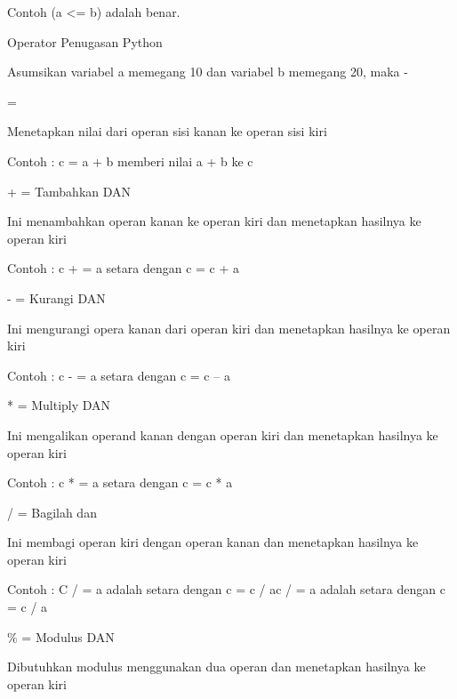 Contoh (a <= b) adalah benar. \par
\vspace{12pt}
\noindent 
Operator Penugasan Python \par
\vspace{12pt}
\noindent 
Asumsikan variabel a memegang 10 dan variabel b memegang 20, maka - \par
\vspace{12pt}
\noindent 
= \par
\noindent 
Menetapkan nilai dari operan sisi kanan ke operan sisi kiri \hspace*{4.41in}  \par
\noindent 
Contoh : c = a + b memberi nilai a + b ke c \par
\noindent 
\vspace{12pt}
\noindent 
+ = Tambahkan DAN \par
\noindent 
Ini menambahkan operan kanan ke operan kiri dan menetapkan hasilnya ke operan kiri \par
\noindent 
Contoh : c + = a setara dengan c = c + a \par
\noindent 
\vspace{12pt}
\noindent 
- = Kurangi DAN \par
\noindent 
Ini mengurangi opera kanan dari operan kiri dan menetapkan hasilnya ke operan kiri \par
\noindent 
Contoh : c - = a setara dengan c = c – a \par
\noindent 
\vspace{12pt}
\noindent 
* = Multiply DAN \par
\noindent 
Ini mengalikan operand kanan dengan operan kiri dan menetapkan hasilnya ke operan kiri \par
\noindent 
Contoh : c * = a setara dengan c = c * a \par
\noindent 
\vspace{12pt}
\noindent 
/ = Bagilah dan \par
\noindent 
Ini membagi operan kiri dengan operan kanan dan menetapkan hasilnya ke operan kiri \par
\noindent 
Contoh : C / = a adalah setara dengan c = c / ac / = a adalah setara dengan c = c / a \par
\noindent 
\vspace{12pt}
\noindent 
 $  \%  $ = Modulus DAN \par
\noindent 
Dibutuhkan modulus menggunakan dua operan dan menetapkan hasilnya ke operan kiri \par

